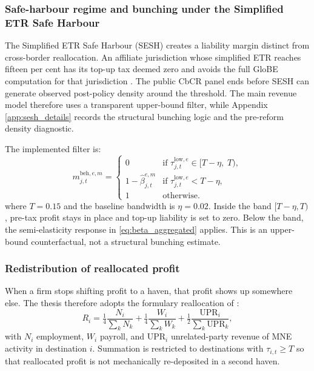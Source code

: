 \documentclass[11pt,a4paper]{article}
\begin{document}
\subsubsection{Safe-harbour regime and bunching under the Simplified ETR Safe Harbour}\label{sec:bunching}\label{sec:sesh}

The Simplified ETR Safe Harbour (SESH) creates a liability margin distinct from cross-border reallocation. An affiliate jurisdiction whose simplified ETR reaches fifteen per cent has its top-up tax deemed zero and avoids the full GloBE computation for that jurisdiction \citep{oecd2026}. The public CbCR panel ends before SESH can generate observed post-policy density around the threshold. The main revenue model therefore uses a transparent upper-bound filter, while Appendix \ref{app:sesh_details} records the structural bunching logic and the pre-reform density diagnostic.

The implemented filter is:
\begin{equation}\label{eq:regime}
m_{j,t}^{\text{beh},e,m} = \begin{cases}
0 & \text{if } \tau_{j,t}^{\text{low},e} \in [T - \eta,\; T), \\[2pt]
1-\hat{\beta}_{j,t}^{e,m} & \text{if } \tau_{j,t}^{\text{low},e} < T - \eta, \\[2pt]
1 & \text{otherwise.}
\end{cases}
\end{equation}
where $T = 0.15$ and the baseline bandwidth is $\eta = 0.02$. Inside the band $[T-\eta,T)$, pre-tax profit stays in place and top-up liability is set to zero. Below the band, the semi-elasticity response in \eqref{eq:beta_aggregated} applies. This is an upper-bound counterfactual, not a structural bunching estimate.

\subsubsection{Redistribution of reallocated profit}\label{sec:reallocation}

When a firm stops shifting profit to a haven, that profit shows up somewhere else. The thesis therefore adopts the formulary reallocation of \citet{garcia-bernardo2024}:
\begin{equation}\label{eq:reallocation}
R_i = \tfrac{1}{4}\frac{N_i}{\sum_{k} N_k} + \tfrac{1}{4}\frac{W_i}{\sum_{k} W_k} + \tfrac{1}{2}\frac{\text{UPR}_i}{\sum_{k} \text{UPR}_k},
\end{equation}
with $N_i$ employment, $W_i$ payroll, and $\text{UPR}_i$ unrelated-party revenue of MNE activity in destination $i$. Summation is restricted to destinations with $\tau_{i,t} \geq T$ so that reallocated profit is not mechanically re-deposited in a second haven.
\end{document}

